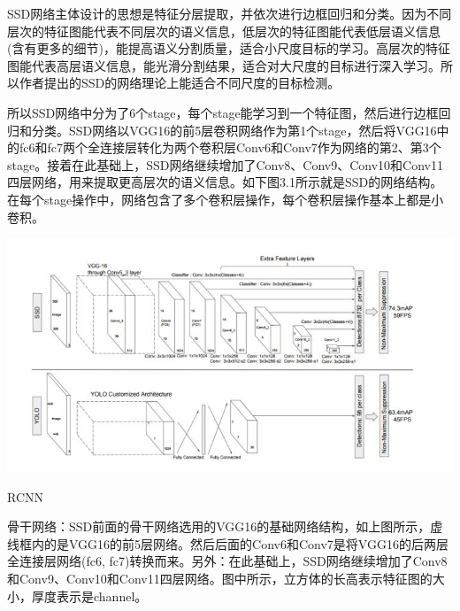 SSD网络主体设计的思想是特征分层提取，并依次进行边框回归和分类。因为不同层次的特征图能代表不同层次的语义信息，低层次的特征图能代表低层语义信息(含有更多的细节)，能提高语义分割质量，适合小尺度目标的学习。高层次的特征图能代表高层语义信息，能光滑分割结果，适合对大尺度的目标进行深入学习。所以作者提出的SSD的网络理论上能适合不同尺度的目标检测。

所以SSD网络中分为了6个stage，每个stage能学习到一个特征图，然后进行边框回归和分类。SSD网络以VGG16的前5层卷积网络作为第1个stage，然后将VGG16中的fc6和fc7两个全连接层转化为两个卷积层Conv6和Conv7作为网络的第2、第3个stage。接着在此基础上，SSD网络继续增加了Conv8、Conv9、Conv10和Conv11四层网络，用来提取更高层次的语义信息。如下图3.1所示就是SSD的网络结构。在每个stage操作中，网络包含了多个卷积层操作，每个卷积层操作基本上都是小卷积。
\begin{uscfigure}
	\includegraphics[width=\textwidth]{./Pictures/ssd_modual.jpg}
	\caption{RCNN}
\end{uscfigure}
骨干网络：SSD前面的骨干网络选用的VGG16的基础网络结构，如上图所示，虚线框内的是VGG16的前5层网络。然后后面的Conv6和Conv7是将VGG16的后两层全连接层网络(fc6, fc7)转换而来。另外：在此基础上，SSD网络继续增加了Conv8和Conv9、Conv10和Conv11四层网络。图中所示，立方体的长高表示特征图的大小，厚度表示是channel。

